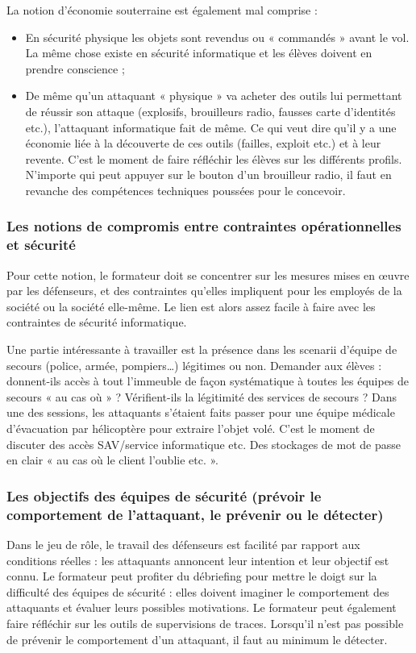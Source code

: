 \documentclass[11pt]{article} %
\begin{document}
La notion d'économie souterraine est également mal comprise : 
\begin{itemize}
\item En sécurité physique les objets sont revendus ou « commandés » avant le
vol. La même chose existe en sécurité informatique et les élèves doivent en
prendre conscience ;
\item De même qu'un attaquant « physique » va acheter des outils lui permettant
de réussir son attaque (explosifs, brouilleurs radio, fausses carte d'identités
etc.), l'attaquant informatique fait de même. Ce qui veut dire qu'il y a une
économie liée à la découverte de ces outils (failles, exploit etc.) et à leur
revente. C'est le moment de faire réfléchir les élèves sur les différents
profils. N'importe qui peut appuyer sur le bouton d'un brouilleur radio, il faut
en revanche des compétences techniques poussées pour le concevoir.
\end{itemize}

\subsubsection{Les notions de compromis entre contraintes opérationnelles et
sécurité }
Pour cette notion, le formateur doit se concentrer sur les mesures mises en
œuvre par les défenseurs, et des contraintes qu'elles impliquent pour les
employés de la société ou la société elle-même. Le lien est alors assez facile à
faire avec les contraintes de sécurité informatique.

Une partie intéressante à travailler est la présence dans les scenarii d'équipe
de secours (police, armée, pompiers…) légitimes ou non. Demander aux élèves :
donnent-ils accès à tout l'immeuble de façon systématique à toutes les équipes
de secours « au cas où » ? Vérifient-ils la légitimité des services de secours ?
Dans une des sessions, les attaquants s'étaient faits passer pour une équipe
médicale d'évacuation par hélicoptère pour extraire l'objet volé. C'est le
moment de discuter des accès SAV/service informatique etc. Des stockages de mot
de passe en clair « au cas où le client l'oublie etc. ».

\subsubsection{Les objectifs des équipes de sécurité (prévoir le comportement de
l'attaquant, le prévenir ou le détecter)}
Dans le jeu de rôle, le travail des défenseurs est facilité par rapport aux
conditions réelles : les attaquants annoncent leur intention et leur objectif
est connu. Le formateur peut profiter du débriefing pour mettre le doigt sur la
difficulté des équipes de sécurité : elles doivent imaginer le comportement des
attaquants et évaluer leurs possibles motivations.
Le formateur peut également faire réfléchir sur les outils de supervisions de
traces. Lorsqu'il n'est pas possible de prévenir le comportement d'un attaquant,
il faut au minimum le détecter.
\end{document}

